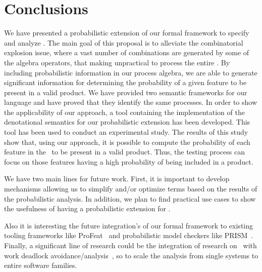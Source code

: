 \section{Conclusions}
\label{section:jstat:concs}

We have presented a probabilistic extension of our
formal framework to specify and analyze \SPLs. The main goal of this
proposal is to alleviate the combinatorial explosion issue, where a vast
number of combinations are generated by some of the algebra operators,
that making unpractical to process the entire \SPL. By including probabilistic information in our process algebra, we are able to generate significant information for determining the probability
of a given feature to be present in a valid product. We have provided two semantic frameworks for our language and have proved that they identify the same processes.
%
In order to show the applicability of our approach, a tool containing the
implementation of the denotational semantics for our probabilistic extension
has been developed. This tool has been used to conduct an experimental study.
%
The results of this study show that, using our approach, it is possible to compute
the probability of each feature in the \SPL\ to be present in a valid product.
Thus, the testing process can focus on those features having a high probability
of being included in a product.



%
%
%
%
We have two main lines for future work. First, it is important to develop
mechanisms allowing us to simplify and/or optimize terms
based on the results of the probabilistic analysis. In addition,
we plan to find practical use cases to show the usefulness of having a probabilistic extension for \SPLs.

Also it is interesting the future integration's of our formal framework to existing tooling frameworks
like ProFeat~\cite{Chrszon2018} and probabilistic model checkers like PRISM~\cite{mgd12}.
Finally, a significant line of research could be the integration of research on \SPL\ with work 
deadlock avoidance/analysis~\cite{BravettiCZ18, BoerBLZ18, BravettiCZ17, AnconaEtAl16, BravettiZ09, BravettiLZ08}, so to 
scale the analysis from single systems to entire software families.

